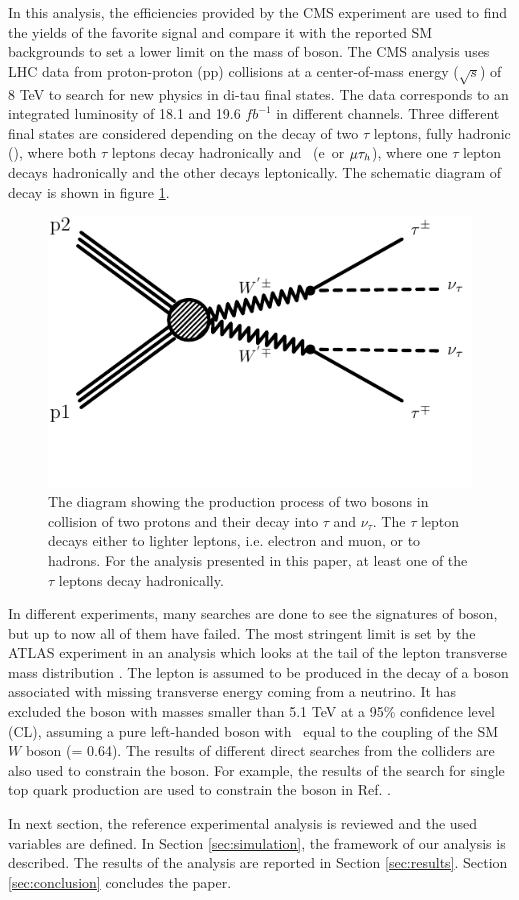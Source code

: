 In this analysis, the efficiencies provided by the CMS experiment \cite{Khachatryan:2016trj} are used to find the yields of the favorite signal and compare it with the reported SM backgrounds to set a lower limit on the mass of \wprime boson. 
The CMS analysis uses LHC data from proton-proton (pp) collisions at a center-of-mass energy ($\sqrt{s}$) of 8 TeV to search for new physics in di-tau final states.  The data corresponds to an integrated luminosity of 18.1 and 19.6 $fb^{-1}$ in different channels. Three different final states are considered depending on the decay of two $\tau$ leptons, fully hadronic (\tauTau), where both $\tau$ leptons decay hadronically and \lepTau  ~(e\Tau ~or $\mu\tau_h$), where one $\tau$ lepton decays hadronically and the other decays leptonically. The schematic diagram of decay is shown in figure \ref{fig:wprimefeyndiagram}.
\begin{figure}[!htb]
  \includegraphics*[width=.45\textwidth]{figs/WpWpTauTau.pdf}
  \caption{The diagram showing the production process of two \wprime bosons in collision of two protons and their decay into $\tau$ and $\nu_{\tau}$. The $\tau$ lepton decays either to lighter leptons, i.e. electron and muon, or to hadrons. For the analysis presented in this paper, at least one of the $\tau$ leptons decay hadronically.}
  \label{fig:wprimefeyndiagram}
\end{figure}

In different experiments, many searches are done to see the signatures of \wprime boson, but up to now all of them have failed. The most stringent limit is set by the ATLAS experiment in an analysis which looks at the tail of the lepton transverse mass distribution \cite{Aaboud:2017efa}. The lepton is assumed to be produced in the decay of a \wprime boson associated with missing transverse energy coming from a neutrino. It has excluded the \wprime boson with masses smaller than 5.1 TeV at a 95\% confidence level (CL), assuming a pure left-handed \wprime boson with \gL ~equal to the coupling of the SM $W$ boson (\gSM = 0.64). The results of different direct searches from the colliders are also used to constrain the \wprime boson. For example, the results of the search for single top quark production are used to constrain the \wprime boson in Ref. \cite{YaserAyazi:2017xyj}.


In next section, the reference experimental analysis is reviewed and the used variables are defined. In Section \ref{sec:simulation}, the framework of our analysis is described. The results of the analysis are reported in Section \ref{sec:results}. Section \ref{sec:conclusion} concludes the paper.